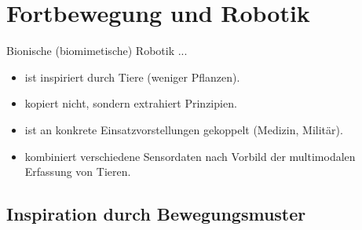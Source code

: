 \section{Fortbewegung und Robotik}

Bionische (biomimetische) Robotik ...

\begin{itemize}
    \item ist inspiriert durch Tiere (weniger Pflanzen).
    \item kopiert nicht, sondern extrahiert Prinzipien.
    \item ist an konkrete Einsatzvorstellungen gekoppelt (Medizin, Militär). 
    \item kombiniert verschiedene Sensordaten nach Vorbild der multimodalen Erfassung von Tieren.
\end{itemize}

\subsection{Inspiration durch Bewegungsmuster}

